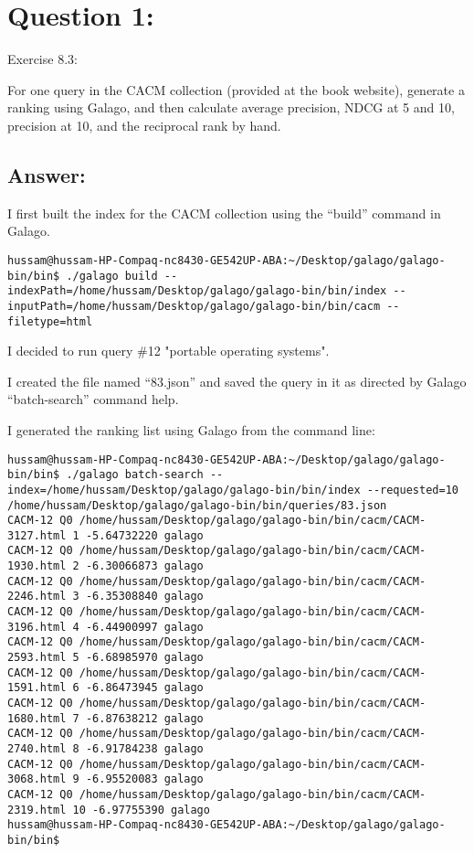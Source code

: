 \section*{Question 1:}
Exercise 8.3: 

For one query in the CACM collection (provided at the book website), generate a ranking using Galago, and then calculate average precision, NDCG at 5 and 10, precision at 10, and the reciprocal rank by hand.

\subsection*{Answer:}

I first built the index for the CACM collection using the ``build'' command in Galago.

\begin{lstlisting}[breakatwhitespace=〈false)]
hussam@hussam-HP-Compaq-nc8430-GE542UP-ABA:~/Desktop/galago/galago-bin/bin$ ./galago build --indexPath=/home/hussam/Desktop/galago/galago-bin/bin/index --inputPath=/home/hussam/Desktop/galago/galago-bin/bin/cacm --filetype=html
\end{lstlisting} 

I decided to run query \#12 "portable operating systems".

I created the file named ``83.json'' and saved the query in it as directed by Galago ``batch-search'' command help.



I generated the ranking list using Galago from the command line:

\begin{lstlisting}[breakatwhitespace=〈false)]
hussam@hussam-HP-Compaq-nc8430-GE542UP-ABA:~/Desktop/galago/galago-bin/bin$ ./galago batch-search --index=/home/hussam/Desktop/galago/galago-bin/bin/index --requested=10 /home/hussam/Desktop/galago/galago-bin/bin/queries/83.json
CACM-12 Q0 /home/hussam/Desktop/galago/galago-bin/bin/cacm/CACM-3127.html 1 -5.64732220 galago
CACM-12 Q0 /home/hussam/Desktop/galago/galago-bin/bin/cacm/CACM-1930.html 2 -6.30066873 galago
CACM-12 Q0 /home/hussam/Desktop/galago/galago-bin/bin/cacm/CACM-2246.html 3 -6.35308840 galago
CACM-12 Q0 /home/hussam/Desktop/galago/galago-bin/bin/cacm/CACM-3196.html 4 -6.44900997 galago
CACM-12 Q0 /home/hussam/Desktop/galago/galago-bin/bin/cacm/CACM-2593.html 5 -6.68985970 galago
CACM-12 Q0 /home/hussam/Desktop/galago/galago-bin/bin/cacm/CACM-1591.html 6 -6.86473945 galago
CACM-12 Q0 /home/hussam/Desktop/galago/galago-bin/bin/cacm/CACM-1680.html 7 -6.87638212 galago
CACM-12 Q0 /home/hussam/Desktop/galago/galago-bin/bin/cacm/CACM-2740.html 8 -6.91784238 galago
CACM-12 Q0 /home/hussam/Desktop/galago/galago-bin/bin/cacm/CACM-3068.html 9 -6.95520083 galago
CACM-12 Q0 /home/hussam/Desktop/galago/galago-bin/bin/cacm/CACM-2319.html 10 -6.97755390 galago
hussam@hussam-HP-Compaq-nc8430-GE542UP-ABA:~/Desktop/galago/galago-bin/bin$
\end{lstlisting}

